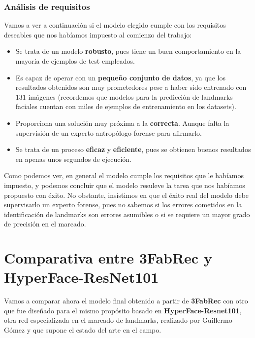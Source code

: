         \medskip

        \subsubsection*{Análisis de requisitos}

        \noindent Vamos a ver a continuación si el modelo elegido cumple con los requisitos deseables que nos habíamos impuesto al comienzo del trabajo: 
        \begin{itemize}
            \item Se trata de un modelo \textbf{robusto}, pues tiene un buen comportamiento en la mayoría de ejemplos de test empleados.
            \item Es capaz de operar con un \textbf{pequeño conjunto de datos}, ya que los resultados obtenidos son muy prometedores pese a haber sido entrenado con $131$ imágenes (recordemos que modelos para la predicción de landmarks faciales cuentan con miles de ejemplos de entrenamiento en los datasets).
            \item Proporciona una solución muy próxima a la \textbf{correcta}. Aunque falta la supervisión de un experto antropólogo forense para afirmarlo.
            \item Se trata de un proceso \textbf{eficaz} y \textbf{eficiente}, pues se obtienen buenos resultados en apenas unos segundos de ejecución.
        \end{itemize}

        \medskip

        \noindent Como podemos ver, en general el modelo cumple los requisitos que le habíamos impuesto, y podemos concluir que el modelo resuleve la tarea que nos habíamos propuesto con éxito. No obstante, insistimos en que el éxito real del modelo debe supervisarlo un experto forense, pues no sabemos si los errores cometidos en la identificación de landmarks son errores asumibles o si se requiere un mayor grado de precisión en el marcado.

    \section{Comparativa entre 3FabRec y HyperFace-ResNet101}
        \noindent Vamos a comparar ahora el modelo final obtenido a partir de \textbf{3FabRec} con otro que fue diseñado para el mismo propósito basado en \textbf{HyperFace-Resnet101}, otra red especializada en el marcado de landmarks, realizado por Guillermo Gómez y que supone el estado del arte en el campo.

